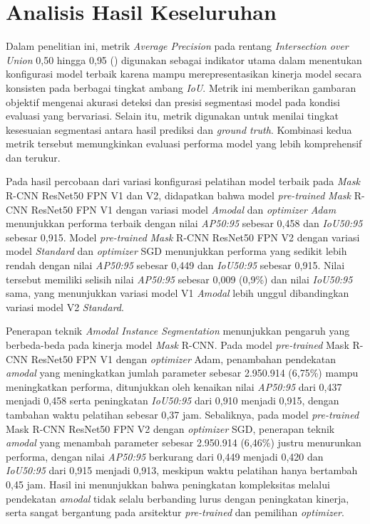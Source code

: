 \section{Analisis Hasil Keseluruhan} \label{IV.Analisis_Hasil_Keseluruhan}
Dalam penelitian ini, metrik \textit{Average Precision} pada rentang \textit{Intersection over Union} 0{,}50 hingga 0{,}95 (\APrangefifty) digunakan sebagai indikator utama dalam menentukan konfigurasi model terbaik karena mampu merepresentasikan kinerja model secara konsisten pada berbagai tingkat ambang \textit{IoU}. Metrik ini memberikan gambaran objektif mengenai akurasi deteksi dan presisi segmentasi model pada kondisi evaluasi yang bervariasi. Selain itu, metrik \IoUrangefiftyy digunakan untuk menilai tingkat kesesuaian segmentasi antara hasil prediksi dan \textit{ground truth}. Kombinasi kedua metrik tersebut memungkinkan evaluasi performa model yang lebih komprehensif dan terukur. \par

Pada hasil percobaan dari variasi konfigurasi pelatihan model terbaik pada \textit{Mask} R-CNN ResNet50 FPN V1 dan V2, didapatkan bahwa model \textit{pre-trained} \textit{Mask} R-CNN ResNet50 FPN V1 dengan variasi model \textit{Amodal} dan \textit{optimizer} \textit{Adam} menunjukkan performa terbaik dengan nilai \textit{AP50:95} sebesar 0{,}458 dan \textit{IoU50:95} sebesar 0{,}915. Model \textit{pre-trained} \textit{Mask} R-CNN ResNet50 FPN V2 dengan variasi model \textit{Standard} dan \textit{optimizer} SGD menunjukkan performa yang sedikit lebih rendah dengan nilai \textit{AP50:95} sebesar 0{,}449 dan \textit{IoU50:95} sebesar 0{,}915. Nilai tersebut memiliki selisih nilai \textit{AP50:95} sebesar 0{,}009 (0{,}9\%) dan nilai \textit{IoU50:95} sama, yang menunjukkan variasi model V1 \textit{Amodal} lebih unggul dibandingkan variasi model V2 \textit{Standard}.  \par

Penerapan teknik \textit{Amodal Instance Segmentation} menunjukkan pengaruh yang berbeda-beda pada kinerja model \textit{Mask} R-CNN. Pada model \textit{pre-trained} Mask R-CNN ResNet50 FPN V1 dengan \textit{optimizer} Adam, penambahan pendekatan \textit{amodal} yang meningkatkan jumlah parameter sebesar 2.950.914 (6{,}75\%) mampu meningkatkan performa, ditunjukkan oleh kenaikan nilai \textit{AP50:95} dari 0{,}437 menjadi 0{,}458 serta peningkatan \textit{IoU50:95} dari 0{,}910 menjadi 0{,}915, dengan tambahan waktu pelatihan sebesar 0{,}37 jam. Sebaliknya, pada model \textit{pre-trained} Mask R-CNN ResNet50 FPN V2 dengan \textit{optimizer} SGD, penerapan teknik \textit{amodal} yang menambah parameter sebesar 2.950.914 (6{,}46\%) justru menurunkan performa, dengan nilai \textit{AP50:95} berkurang dari 0{,}449 menjadi 0{,}420 dan \textit{IoU50:95} dari 0{,}915 menjadi 0{,}913, meskipun waktu pelatihan hanya bertambah 0{,}45 jam. Hasil ini menunjukkan bahwa peningkatan kompleksitas melalui pendekatan \textit{amodal} tidak selalu berbanding lurus dengan peningkatan kinerja, serta sangat bergantung pada arsitektur \textit{pre-trained} dan pemilihan \textit{optimizer}. \par

